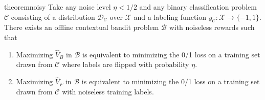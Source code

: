 \begin{restatable}{theorem}{noisy}\label{thm:noisy}
Take any noise level $ \eta < 1/2$ and any binary classification problem $ \mathcal{C}$ consisting of a distribution $\mathcal{D}_\mathcal{C}$ over $ \mathcal{X}$ and a labeling function $ y_{\mathcal{C}}: \mathcal{X} \to \{-1,1\}$.
There exists an offline contextual bandit problem $ \mathcal{B}$ with noiseless rewards such that
\begin{enumerate}
    \item Maximizing $ \hat V_B$ in $\mathcal{B}$ is equivalent to minimizing the 0/1 loss on a training set drawn from $ \mathcal{C}$ where labels are flipped with probability $ \eta$.
    \item Maximizing $ \hat V_F$ in $\mathcal{B}$ is equivalent to minimizing the 0/1 loss on a training set drawn from $ \mathcal{C}$ with noiseless training labels.
\end{enumerate}
\end{restatable}

